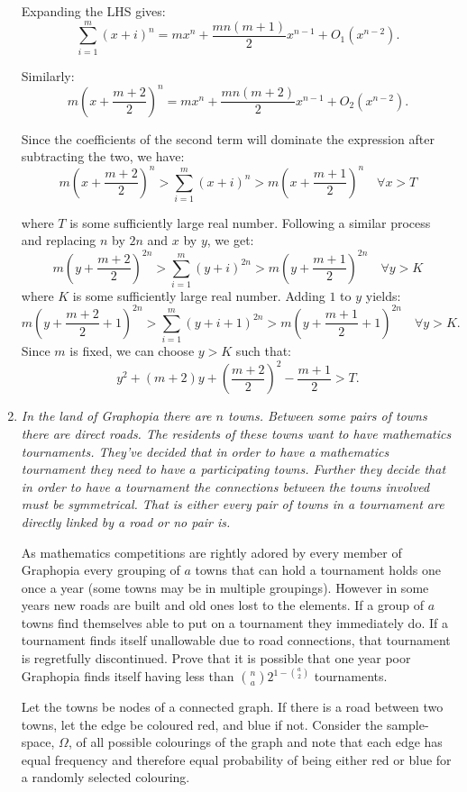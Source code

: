 \documentclass{article}
\begin{document}
\begin{enumerate}
Expanding the LHS gives:
$$\sum_{i = 1}^{m} (x + i)^n = mx^n + \frac{mn(m + 1)}{2}x^{n - 1} + O_1(x^{n - 2}).$$

Similarly:
$$m\left(x + \frac{m + 2}{2}\right)^n = mx^n + \frac{mn(m + 2)}{2}x^{n - 1} + O_2(x^{n - 2}).$$

Since the coefficients of the second term will dominate the expression after subtracting the two, we have:
$$m\left(x + \frac{m + 2}{2}\right)^n > \sum_{i = 1}^{m} (x + i)^n > m\left(x + \frac{m + 1}{2}\right)^n \quad \forall x > T$$

where $T$ is some sufficiently large real number.
Following a similar process and replacing $n$ by $2n$ and $x$ by $y$, we get:
$$m\left(y + \frac{m + 2}{2}\right)^{2n} > \sum_{i = 1}^{m} (y + i)^{2n} > m(y + \frac{m + 1}{2})^{2n} \quad \forall y > K$$
where $K$ is some sufficiently large real number.
Adding $1$ to $y$ yields:
$$m\left(y + \frac{m + 2}{2} + 1\right)^{2n} > \sum_{i = 1}^{m} (y + i + 1)^{2n} > m\left(y + \frac{m + 1}{2} + 1\right)^{2n} \quad \forall y > K.$$
Since $m$ is fixed, we can choose $y > K$ such that: 
$$y^2 + (m + 2)y + \left(\frac{m + 2}{2}\right)^2 - \frac{m + 1}{2} > T.$$

\medskip
\item %
{\itshape In the land of Graphopia there are $n$ towns. Between some pairs of towns there are direct roads. The residents of these towns want to have mathematics tournaments. They've decided that in order to have a mathematics tournament they need to have $a$ participating towns. Further they decide that in order to have a tournament the connections between the towns involved must be symmetrical. That is either every pair of towns in a tournament are directly linked by a road or no pair is. 

As mathematics competitions are rightly adored by every member of Graphopia every grouping of $a$ towns that can hold a tournament holds one once a year (some towns may be in multiple groupings). However in some years new roads are built and old ones lost to the elements. If a group of $a$ towns find themselves able to put on a tournament they immediately do. If a tournament finds itself unallowable due to road connections, that tournament is regretfully discontinued. Prove that it is possible that one year poor Graphopia finds itself having less than $\displaystyle \binom{n}{a} $$2^{1-\binom{a}{2}}$ tournaments.
}


Let the towns be nodes of a connected graph. If there is a road between two towns, let the edge be coloured red, and blue if not.
Consider the sample-space, $\Omega$, of all possible colourings of the graph and note that each edge has equal frequency and therefore equal probability of being either red or blue for a randomly selected colouring.


\end{enumerate}
\end{document}
